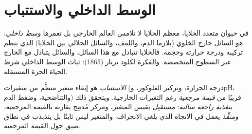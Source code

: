 \section{الوسط الداخلي والاستتباب}

\begin{definition}\label{def:b1:organism-environment:milieu}
في حيوان متعدد الخلايا، معظم الخلايا لا تلامس العالم الخارجي بل
تغمرها \emph{وسط داخلي}: هو السائل خارج الخلوي
(بلازما الدم، واللمف، والسائل الخلالي بين الخلايا) الذي ينظم  تركيبه ودرجة حرارته وحجمه. فالخلايا تتبادل مع هذا السائل،
والسائل يتبادل مع الخارج عبر السطوح المتخصصة. والفكرة لكلود برنار
(1865): ثبات الوسط الداخلي شرط الحياة الحرة المستقلة.
\end{definition}

\begin{definition}[الاستتباب]\label{def:b1:organism-environment:homeostasis}
\emph{الاستتباب} هو إبقاء متغير منظَّم من متغيرات
 (درجة الحرارة، وتركيز الغلوكوز، وpH، والتناضحية، وضغط
الدم) قريبًا من \emph{قيمة مرجعية} رغم
التغيرات الخارجية. ويتحقق ذلك \emph{بتغذية راجعة سالبة}:
\emph{مستقبِل} يقيس المتغير، ومركز مُدمِج يقارنه بالقيمة المرجعية،
\emph{ومنفِّذ} يعمل في الاتجاه الذي يلغي الانحراف. والمتغير ليس
ثابتًا بل يتذبذب في نطاق ضيق حول القيمة المرجعية.
\end{definition}

